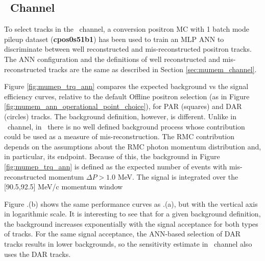 \subsection{\MuToEp\ Channel}
\label{sec:mumep_channel}

To select tracks in {\blue the} \MuToEp\ channel, a  {\blue conversion positron MC with 1 batch}
mode pileup  {\blue dataset ({\bf cpos0s51b1})}
has been used to train  {\blue an} MLP ANN to discriminate between  {\blue well reconstructed}
and mis-reconstructed positron tracks.
The ANN configuration and the definitions of  well reconstructed and mis-reconstructed tracks are
the same as described in Section \ref{sec:mumem_channel}.

Figure \ref{fig:mumep_trq_ann} compares the expected background vs the signal efficiency curves,
 {\blue relative to the default Offline positron selection (as in Figure \ref{fig:mumem_ann_operational_point_choice})},
for PAR (squares) and DAR {\blue (}circles) tracks.
The background definition, however, is different. Unlike in \MuToEm\ channel, in \MuToEp\ there is
no well defined background process  {\blue whose} contribution could be used as a measure of mis-reconstruction.
The RMC contribution depends on the assumptions about the RMC photon momentum distribution and,
in particular, its endpoint. Because of this, the background in Figure \strike{\ref{fig:mumem_ann_operational_point_choice}}
{\blue \ref{fig:mumep_trq_ann}}
is defined as the expected number of events with  {\blue mis-reconstructed} momentum $\Delta{P} > 1.0$ MeV.
The signal is integrated over the [90.5,92.5] MeV/c momentum window

Figure \strike{\ref{fig:mumem_ann_operational_point_choice}}{\blue \ref{fig:mumep_trq_ann}}.(b) shows the same performance curves
as \strike{\ref{fig:mumem_ann_operational_point_choice}}{\blue \ref{fig:mumep_trq_ann}}.(a), but with the vertical axis in logarithmic scale.
It is interesting to see\strike{,} that for {\blue a} given background definition, the background increases exponentially
with the signal acceptance for both types of tracks.
For the same signal acceptance, the ANN-based selection of DAR tracks results in lower
background{\blue s}, so the sensitivity estimate in \MuToEp\ channel also uses the DAR tracks. 

